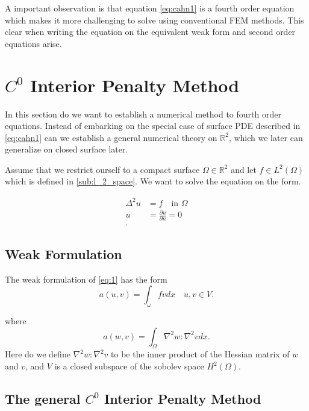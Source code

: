 A important observation is that equation \eqref{eq:cahn1} is a fourth order equation which makes it more challenging to
solve using conventional FEM methods. This clear when writing the equation on the equivalent weak form and second order
equations arise.


\section{$C^0$ Interior Penalty Method}
\label{sec:ch1}

In this section do we want to establish a numerical method to fourth order equations. Instead of embarking on the
special case of surface PDE described in \eqref{eq:cahn1} can we establish a general numerical theory on $\mathbb{R}
^2$, which we later can generalize on closed surface later.

Assume that we restrict ourself to a compact surface $\Omega \in \mathbb{R} ^2 $ and let $f \in L^{2}\left( \Omega  \right) $
which is defined in \ref{sub:l_2_space}.
We want to solve the equation on the form.

\begin{align}
    \label{eq:1}
    \Delta ^{2} u &= f \quad \text{in } \Omega  \\
    u &= \frac{\partial u}{\partial n} = 0  \\
.\end{align}

\subsection{Weak Formulation}%
\label{sub:weak_formulation}


The weak formulation of \eqref{eq:1} has the form
\begin{equation}
\label{eq:2}
    a\left( u,v \right) = \int_{\omega}^{} f v dx \quad u,v \in V
.\end{equation}

where
\begin{equation}
\label{eq:3}
    a\left( w,v \right) = \int_{\Omega }^{} \nabla ^2 w : \nabla ^2 v dx
.\end{equation}
Here do we define $\nabla ^2 w : \nabla ^2 v $ to be the inner product of the Hessian matrix of $w$  and $v$, and $V$
is a closed subspace of the sobolev space $H^2\left( \Omega  \right)$.


\subsection{The general $C^0$ Interior Penalty Method}%
\label{sub:_c_0_interior_penalty_method}


